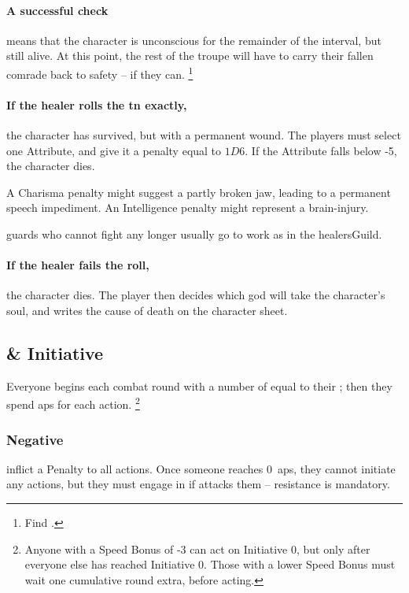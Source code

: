 \begin{multicols}{2}
\paragraph{A successful check}
means that the character is unconscious for the remainder of the \gls{interval}, but still alive.
At this point, the rest of the troupe will have to carry their fallen comrade back to safety -- if they can.%
\footnote{Find  .}

\paragraph{If the healer rolls the \gls{tn} exactly,}
the character has survived, but with a permanent wound.
The players must select one Attribute, and give it a penalty equal to $1D6$.
If the Attribute falls below -5, the character dies.

A Charisma penalty might suggest a partly broken jaw, leading to a permanent speech impediment.
An Intelligence penalty might represent a brain-injury.

\Glspl{guard} who cannot fight any longer usually go to work as  in the \gls{healersGuild}.

\paragraph{If the healer fails the roll,}
the character dies.
The player then decides which god will take the character's soul, and writes the cause of death on the character sheet.

\subsection{ \& Initiative}
\label{actionPoints}

Everyone begins each \gls{combat} \gls{round} with a number of  equal to their ; then they spend \glspl{ap} for each action.%
\footnote{Anyone with a Speed Bonus of -3 can act on Initiative 0, but only after everyone else has reached Initiative 0.
Those with a lower Speed Bonus must wait one cumulative round extra, before acting.}

\subsubsection{Negative }
inflict a Penalty to all \glspl{action}.
Once someone reaches 0~\glspl{ap}, they cannot initiate any actions, but they must engage in  if  attacks them -- resistance is mandatory.


\end{multicols}

